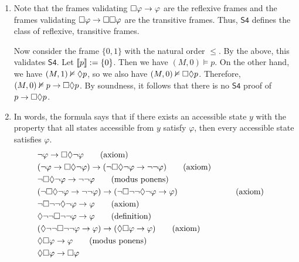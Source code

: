 \documentclass{article}
\begin{document}
\begin{ex}
\begin{enumerate}
\item Note that the frames validating $\square\varphi\to\varphi$ are the reflexive frames and the
frames validating $\square\varphi\to\square\square\varphi$ are the transitive frames. Thus, $\mathsf{S4}$
defines the class of reflexive, transitive frames. 

Now consider the frame $\{0,1\}$ with the natural order $\leq$. By the above, this validates $\mathsf{S4}$. Let $\llbracket p\rrbracket:=\{0\}$. Then we have $(M,0)\models p$. On the other hand, we have $(M,1)\nvDash\lozenge p$, so we also have $(M,0)\nvDash\square\lozenge p$. Therefore, $(M,0)\nvDash p\to\square\lozenge p$. By soundness, it follows
that there is no $\mathsf{S4}$ proof of $p\to\square\lozenge p$.
\item In words, the formula says that if there exists an accessible state $y$ with the property that all states accessible from $y$ satisfy $\varphi$, then every accessible state satisfies $\varphi$. 
\begin{align*}
& \neg\varphi\to\square\lozenge\neg\varphi
  \tag{axiom}
  \\
& (\neg\varphi\to\square\lozenge\neg\varphi)\to(\neg\square\lozenge\neg\varphi\to\neg\neg\varphi)
  \tag{axiom}
  \\
& \neg\square\lozenge\neg\varphi\to\neg\neg\varphi
  \tag{modus ponens}
  \\
& (\neg\square\lozenge\neg\varphi\to\neg\neg\varphi)\to(\neg\square\neg\neg\lozenge\neg\varphi\to\varphi)
  & &
  \tag{axiom}
  \\
& \neg\square\neg\neg\lozenge\neg\varphi\to\varphi
  \tag{axiom}
  \\
& \lozenge\neg\neg\square\neg\neg\varphi\to\varphi
  \tag{definition}
  \\
& (\lozenge\neg\neg\square\neg\neg\varphi\to\varphi)\to(\lozenge\square\varphi\to\varphi)
  \tag{axiom}
  \\
& \lozenge\square\varphi\to\varphi
  \tag{modus ponens}
  \\
& \lozenge\square\varphi\to\square\varphi
\end{align*} 
\end{enumerate}
\end{ex}
\end{document}
